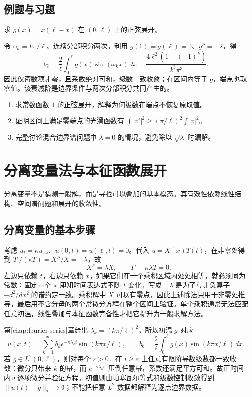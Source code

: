 \documentclass[UTF8,12pt,a4paper,fontset=fandol]{ctexbook}
\begin{document}
\section{例题与习题}
\begin{example}
求 $g(x)=x(\ell-x)$ 在 $(0,\ell)$ 上的正弦展开。
\end{example}
\begin{solve}
令 $\omega_k=k\pi/\ell$。连续分部积分两次，利用 $g(0)=g(\ell)=0$、$g''=-2$，得
\[
 b_k=\frac2\ell\int_0^\ell g(x)\sin(\omega_kx)\,dx
 =\frac{4\ell^2(1-(-1)^k)}{k^3\pi^3}.
\]
因此仅奇数项非零，且系数绝对可和，级数一致收敛；在区间内等于 $g$，端点也取零值。该衰减阶是边界条件与两次分部积分共同产生的。
\end{solve}
\begin{enumerate}
 \item 求常数函数 $1$ 的正弦展开，解释为何级数在端点不恢复原取值。
 \item 证明区间上满足零端点的光滑函数有 $\int|v'|^2\ge(\pi/\ell)^2\int|v|^2$。
 \item 完整讨论混合边界谱问题中 $\lambda=0$ 的情况，避免除以 $\sqrt\lambda$ 时漏解。
\end{enumerate}

\chapter{分离变量法与本征函数展开}
\label{chap:separation}

分离变量不是猜测一般解，而是寻找可以叠加的基本模态。其有效性依赖线性结构、空间谱问题和展开的收敛性。

\section{分离变量的基本步骤}
考虑 $u_t=\kappa u_{xx}$、$u(0,t)=u(\ell,t)=0$。代入 $u=X(x)T(t)$，在非零处得到 $T'/(\kappa T)=X''/X=-\lambda$，故
\[
 -X''=\lambda X,\qquad T'+\kappa\lambda T=0.
\]
左边只依赖 $t$，右边只依赖 $x$，如果它们在一个乘积区域内处处相等，就必须同为常数：固定一个 $x$ 即知时间表达式不随 $t$ 变化。写成 $-\lambda$ 是为了与非负算子 $-d^2/dx^2$ 的谱约定一致。乘积解中 $X$ 可以有零点，因此上述除法只用于非零处推导，最后用不含分母的两个常微分方程在整个区间上验证。单个乘积通常无法匹配任意初温，线性叠加与本征函数完备性才把它提升为一般求解方法。

第\ref{chap:fourier-series}章给出 $\lambda_k=(k\pi/\ell)^2$，所以初温 $g$ 对应
\begin{equation}
 u(x,t)=\sum_{k=1}^\infty b_k e^{-\kappa\lambda_kt}\sin(k\pi x/\ell),
 \qquad b_k=\frac2\ell\int_0^\ell g(x)\sin(k\pi x/\ell)\,dx.
 \label{eq:heat-sine-solution}
\end{equation}
若 $g\in L^2(0,\ell)$，则对每个 $\varepsilon>0$，在 $t\ge\varepsilon$ 上任意有限阶导数级数都一致收敛：微分只带来 $k$ 的幂，而 $e^{-\kappa\lambda_k\varepsilon}$ 压倒任意幂，系数还满足平方可和。故正时间内可逐项微分并验证方程。初值则由帕塞瓦尔等式和级数控制收敛得到 $\|u(t)-g\|_2\to0$；不能把任意 $L^2$ 数据都解释为逐点边界数据。
\end{document}
